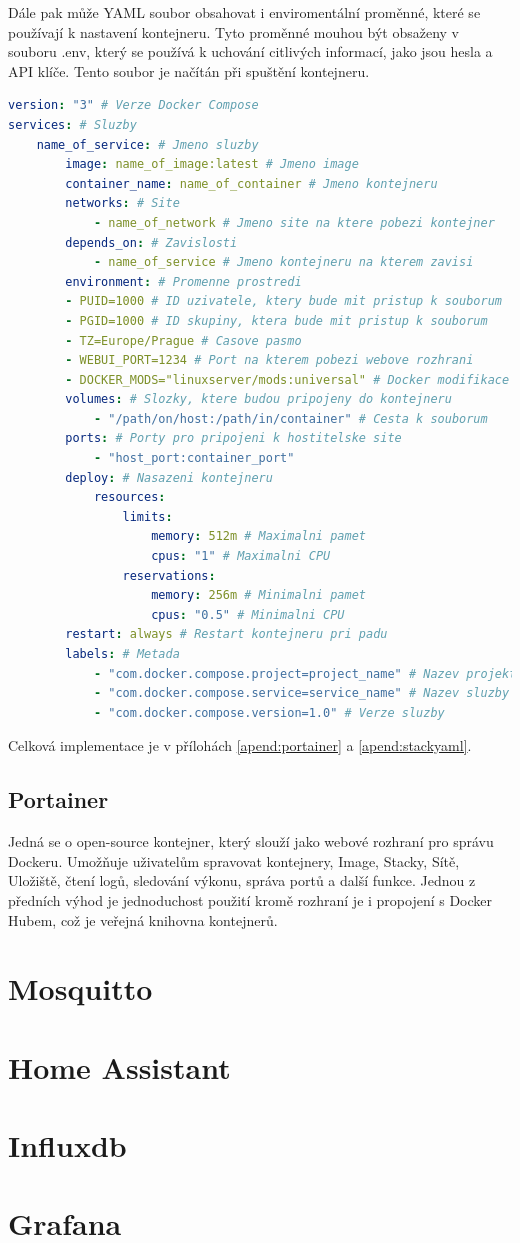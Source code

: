 Dále pak může YAML soubor obsahovat i enviromentální proměnné, které se používají k nastavení kontejneru. Tyto proměnné mouhou být obsaženy v souboru .env, který se používá k uchování citlivých informací, jako jsou hesla a API klíče. Tento soubor je načítán při spuštění kontejneru. \cite{ENV}
\begin{lstlisting}[language=yaml, caption=Ukazka YAML souboru, label=lst:yaml]
version: "3" # Verze Docker Compose
services: # Sluzby
    name_of_service: # Jmeno sluzby
        image: name_of_image:latest # Jmeno image
        container_name: name_of_container # Jmeno kontejneru
        networks: # Site
            - name_of_network # Jmeno site na ktere pobezi kontejner
        depends_on: # Zavislosti
            - name_of_service # Jmeno kontejneru na kterem zavisi
        environment: # Promenne prostredi
        - PUID=1000 # ID uzivatele, ktery bude mit pristup k souborum
        - PGID=1000 # ID skupiny, ktera bude mit pristup k souborum
        - TZ=Europe/Prague # Casove pasmo
        - WEBUI_PORT=1234 # Port na kterem pobezi webove rozhrani 
        - DOCKER_MODS="linuxserver/mods:universal" # Docker modifikace
        volumes: # Slozky, ktere budou pripojeny do kontejneru
            - "/path/on/host:/path/in/container" # Cesta k souborum
        ports: # Porty pro pripojeni k hostitelske site
            - "host_port:container_port"
        deploy: # Nasazeni kontejneru
            resources:
                limits:
                    memory: 512m # Maximalni pamet
                    cpus: "1" # Maximalni CPU
                reservations:
                    memory: 256m # Minimalni pamet
                    cpus: "0.5" # Minimalni CPU
        restart: always # Restart kontejneru pri padu
        labels: # Metada
            - "com.docker.compose.project=project_name" # Nazev projektu
            - "com.docker.compose.service=service_name" # Nazev sluzby
            - "com.docker.compose.version=1.0" # Verze sluzby
\end{lstlisting}
\noindent Celková implementace je v přílohách \ref{apend:portainer} a \ref{apend:stackyaml}.
\subsection{Portainer}
Jedná se o open-source kontejner, který slouží jako webové rozhraní pro správu Dockeru. Umožňuje uživatelům spravovat kontejnery, Image, Stacky, Sítě, Uložiště, čtení logů, sledování výkonu, správa portů a další funkce. Jednou z předních výhod je jednoduchost použití kromě rozhraní je i propojení s Docker Hubem, což je veřejná knihovna kontejnerů. \cite{Portainer} 
\section{Mosquitto}
\section{Home Assistant}
\section{Influxdb}
\section{Grafana}